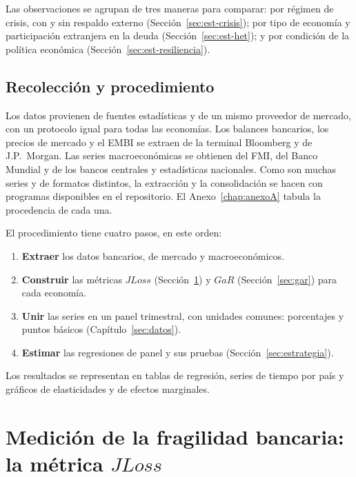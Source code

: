 Las observaciones se agrupan de tres maneras para comparar: por régimen de crisis, con y sin respaldo externo (Sección~\ref{sec:est-crisis}); por tipo de economía y participación extranjera en la deuda (Sección~\ref{sec:est-het}); y por condición de la política económica (Sección~\ref{sec:est-resiliencia}).

\subsection{Recolección y procedimiento}
\label{sec:procedimiento}

Los datos provienen de fuentes estadísticas y de un mismo proveedor de mercado, con un protocolo igual para todas las economías. Los balances bancarios, los precios de mercado y el EMBI se extraen de la terminal Bloomberg y de J.P.\ Morgan. Las series macroeconómicas se obtienen del FMI, del Banco Mundial y de los bancos centrales y estadísticas nacionales. Como son muchas series y de formatos distintos, la extracción y la consolidación se hacen con programas disponibles en el repositorio. El Anexo~\ref{chap:anexoA} tabula la procedencia de cada una.

El procedimiento tiene cuatro pasos, en este orden:
\begin{enumerate}
    \item \textbf{Extraer} los datos bancarios, de mercado y macroeconómicos.
    \item \textbf{Construir} las métricas $JLoss$ (Sección~\ref{sec:jloss}) y $GaR$ (Sección~\ref{sec:gar}) para cada economía.
    \item \textbf{Unir} las series en un panel trimestral, con unidades comunes: porcentajes y puntos básicos (Capítulo~\ref{sec:datos}).
    \item \textbf{Estimar} las regresiones de panel y sus pruebas (Sección~\ref{sec:estrategia}).
\end{enumerate}
Los resultados se representan en tablas de regresión, series de tiempo por país y gráficos de elasticidades y de efectos marginales.

\section{Medición de la fragilidad bancaria: la métrica \texorpdfstring{$JLoss$}{JLoss}}
\label{sec:jloss}

